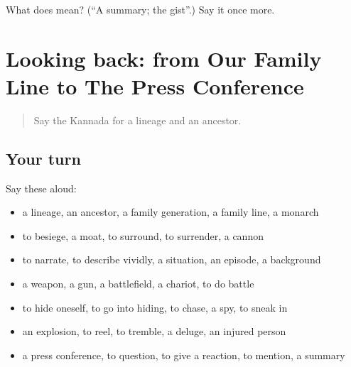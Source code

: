 \begin{tcolorbox}[breakable,colback=teal!4,colframe=teal!35!black,title={Before you move on}]
What does  mean? (\textquotedblleft{}A summary; the gist\textquotedblright{}.) Say it once more.
\end{tcolorbox}
\section[(dialogue)]{Looking back: from Our Family Line to The Press Conference}

\label{lesson:KA-R347-review-341-347}



\begin{quote}
Say the Kannada for a lineage and an ancestor.
\end{quote}

\subsection*{Your turn}
Say these aloud:

\begin{itemize}
\raggedright
  \item a lineage, an ancestor, a family generation, a family line, a monarch
  \item to besiege, a moat, to surround, to surrender, a cannon
  \item to narrate, to describe vividly, a situation, an episode, a background
  \item a weapon, a gun, a battlefield, a chariot, to do battle
  \item to hide oneself, to go into hiding, to chase, a spy, to sneak in
  \item an explosion, to reel, to tremble, a deluge, an injured person
  \item a press conference, to question, to give a reaction, to mention, a summary
\end{itemize}

